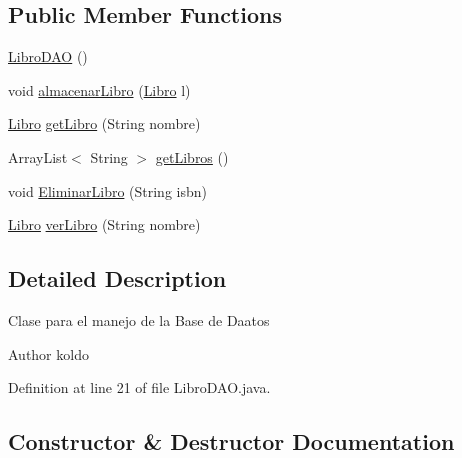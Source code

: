 \subsection*{Public Member Functions}
\begin{DoxyCompactItemize}
\item 
\mbox{\hyperlink{classes_1_1deusto_1_1spq_1_1biblioteca_1_1dao_1_1_libro_d_a_o_a38fd5424c7035205c517d4e7075e5720}{Libro\+D\+AO}} ()
\item 
void \mbox{\hyperlink{classes_1_1deusto_1_1spq_1_1biblioteca_1_1dao_1_1_libro_d_a_o_ad2e2db382c6dac9c6ba0ca95d12438ad}{almacenar\+Libro}} (\mbox{\hyperlink{classes_1_1deusto_1_1spq_1_1biblioteca_1_1data_1_1_libro}{Libro}} l)
\item 
\mbox{\hyperlink{classes_1_1deusto_1_1spq_1_1biblioteca_1_1data_1_1_libro}{Libro}} \mbox{\hyperlink{classes_1_1deusto_1_1spq_1_1biblioteca_1_1dao_1_1_libro_d_a_o_a9b8af041955b5e4abd0e96b7da68a35a}{get\+Libro}} (String nombre)
\item 
Array\+List$<$ String $>$ \mbox{\hyperlink{classes_1_1deusto_1_1spq_1_1biblioteca_1_1dao_1_1_libro_d_a_o_a4af7e01dd7de88e84de3ce7084fcb37a}{get\+Libros}} ()
\item 
void \mbox{\hyperlink{classes_1_1deusto_1_1spq_1_1biblioteca_1_1dao_1_1_libro_d_a_o_a9c3cfc8c276f20d51bef2af2b204a84a}{Eliminar\+Libro}} (String isbn)
\item 
\mbox{\hyperlink{classes_1_1deusto_1_1spq_1_1biblioteca_1_1data_1_1_libro}{Libro}} \mbox{\hyperlink{classes_1_1deusto_1_1spq_1_1biblioteca_1_1dao_1_1_libro_d_a_o_a8138eaa485efda1fa97a158f460301dd}{ver\+Libro}} (String nombre)
\end{DoxyCompactItemize}


\subsection{Detailed Description}
Clase para el manejo de la Base de Daatos \begin{DoxyAuthor}{Author}
koldo 
\end{DoxyAuthor}


Definition at line 21 of file Libro\+D\+A\+O.\+java.



\subsection{Constructor \& Destructor Documentation}
\mbox{\label{classes_1_1deusto_1_1spq_1_1biblioteca_1_1dao_1_1_libro_d_a_o_a38fd5424c7035205c517d4e7075e5720}} 

